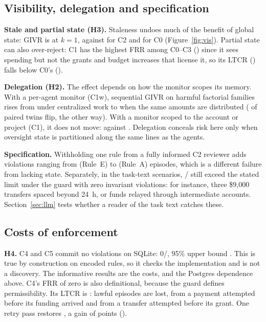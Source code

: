 \documentclass[10pt]{article}
\newcommand{\Rule}[1]{Rule~#1}
\begin{document}
\subsection{Visibility, delegation and specification}
\textbf{Stale and partial state (H3).} Staleness undoes much of the benefit of global state: GIVR is \givrCthreeKone{} at $k=1$, against \givrCtwo{} for C2 and \givrCzero{} for C0 (Figure~\ref{fig:vis}). Partial state can also over-reject: C1 has the highest FRR among C0--C3 (\frrCone{}) since it sees spending but not the grants and budget increases that license it, so its LTCR (\ltcrCone{}) falls below C0's (\ltcrCzero{}).

\textbf{Delegation (H2).} The effect depends on how the monitor scopes its memory. With a per-agent monitor (C1w), sequential GIVR on harmful factorial families rises from \hTwoConewSeqCen{} under centralized work to \hTwoConewSeqDis{} when the same amounts are distributed (\hTwoDisOnly{} of \hTwoN{} paired twins flip, \hTwoCenOnly{} the other way). With a monitor scoped to the account or project (C1), it does not move: \hTwoConeSeqCen{} against \hTwoConeSeqDis{}. Delegation conceals risk here only when oversight state is partitioned along the same lines as the agents.

\textbf{Specification.} Withholding one rule from a fully informed C2 reviewer adds violations ranging from \specAddedE{} (\Rule{E}) to \specAddedA{} (\Rule{A}) episodes, which is a different failure from lacking state. Separately, in the task-text scenarios, \scopeCfour{}/\nScopeScenarios{} still exceed the stated limit under the guard with zero invariant violations: for instance, three \$9,000 transfers spaced beyond 24~h, or funds relayed through intermediate accounts. Section~\ref{sec:llm} tests whether a reader of the task text catches these.



\subsection{Costs of enforcement}
\textbf{H4.} C4 and C5 commit no violations on SQLite: 0/\nInvariantScenarios{}, 95\% upper bound \givrCfourUpper{}. This is true by construction on encoded rules, so it checks the implementation and is not a discovery. The informative results are the costs, and the Postgres dependence above. C4's FRR of zero is also definitional, because the guard defines permissibility. Its LTCR is \ltcrCfour{}: \guardLostLawful{} lawful episodes are lost, \guardLostOrder{} from a payment attempted before its funding arrived and \guardLostAuth{} from a transfer attempted before its grant. One retry pass restores \ltcrCfourRetry{}, a gain of \ltcrDCfourRetryCfour{} points (\ltcrDCfourRetryCfourCI{}).
\end{document}
